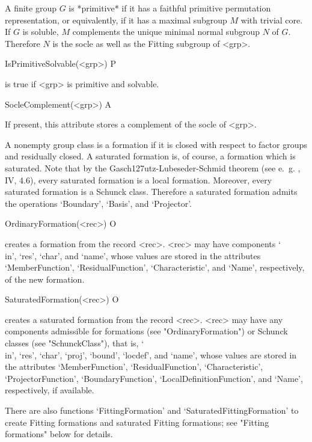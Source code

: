 
A finite group $G$ is *primitive* if it has a faithful primitive permutation 
representation, or equivalently, if it has a maximal subgroup $M$ with trivial 
core. If $G$ is soluble, $M$ complements the unique minimal normal subgroup $N$
of $G$. Therefore $N$ is the socle as well as the Fitting subgroup of <grp>.


\>IsPrimitiveSolvable(<grp>) P

is true if <grp> is primitive and solvable.


\>SocleComplement(<grp>) A

If present, this attribute stores a complement of the socle of <grp>.



A nonempty group class is a  formation if it is closed with respect to factor
groups and residually closed. A saturated formation is, of course, a
formation which is saturated. Note that by the
Gasch\accent127utz-Lubeseder-Schmid theorem (see e.~g. \cite{DH1992}, IV,
4.6), every saturated formation is a local formation. Moreover, every
saturated formation is a Schunck class. Therefore a saturated formation
admits the operations `Boundary', `Basis', and `Projector'.


\>OrdinaryFormation(<rec>) O

creates a formation from the record <rec>. <rec> may have components `\\in',
`res', `char', and `name', whose values are stored in the attributes
`MemberFunction', `ResidualFunction', `Characteristic', and
`Name', respectively, of the new formation.


\>SaturatedFormation(<rec>) O

creates a saturated formation from the record <rec>. <rec> may have any
components admissible for formations (see "OrdinaryFormation") or Schunck
classes (see "SchunckClass"), that is, `\\in', `res', `char', `proj',
`bound', `locdef', and `name', 
 whose values are stored in the attributes `MemberFunction',
`ResidualFunction', `Characteristic',  `ProjectorFunction',
`BoundaryFunction', `LocalDefinitionFunction', and
`Name', respectively, if available. 

There are also functions `FittingFormation' and `SaturatedFittingFormation'
to create Fitting
formations and saturated Fitting formations; see
 "Fitting formations" below for details. 



